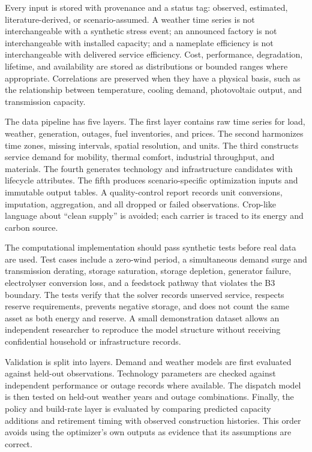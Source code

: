 \documentclass[conference]{IEEEtran}
\begin{document}
Every input is stored with provenance and a status tag: observed, estimated, literature-derived, or scenario-assumed. A weather time series is not interchangeable with a synthetic stress event; an announced factory is not interchangeable with installed capacity; and a nameplate efficiency is not interchangeable with delivered service efficiency. Cost, performance, degradation, lifetime, and availability are stored as distributions or bounded ranges where appropriate. Correlations are preserved when they have a physical basis, such as the relationship between temperature, cooling demand, photovoltaic output, and transmission capacity.

The data pipeline has five layers. The first layer contains raw time series for load, weather, generation, outages, fuel inventories, and prices. The second harmonizes time zones, missing intervals, spatial resolution, and units. The third constructs service demand for mobility, thermal comfort, industrial throughput, and materials. The fourth generates technology and infrastructure candidates with lifecycle attributes. The fifth produces scenario-specific optimization inputs and immutable output tables. A quality-control report records unit conversions, imputation, aggregation, and all dropped or failed observations. Crop-like language about ``clean supply'' is avoided; each carrier is traced to its energy and carbon source.

The computational implementation should pass synthetic tests before real data are used. Test cases include a zero-wind period, a simultaneous demand surge and transmission derating, storage saturation, storage depletion, generator failure, electrolyser conversion loss, and a feedstock pathway that violates the B3 boundary. The tests verify that the solver records unserved service, respects reserve requirements, prevents negative storage, and does not count the same asset as both energy and reserve. A small demonstration dataset allows an independent researcher to reproduce the model structure without receiving confidential household or infrastructure records.

Validation is split into layers. Demand and weather models are first evaluated against held-out observations. Technology parameters are checked against independent performance or outage records where available. The dispatch model is then tested on held-out weather years and outage combinations. Finally, the policy and build-rate layer is evaluated by comparing predicted capacity additions and retirement timing with observed construction histories. This order avoids using the optimizer's own outputs as evidence that its assumptions are correct.
\end{document}
